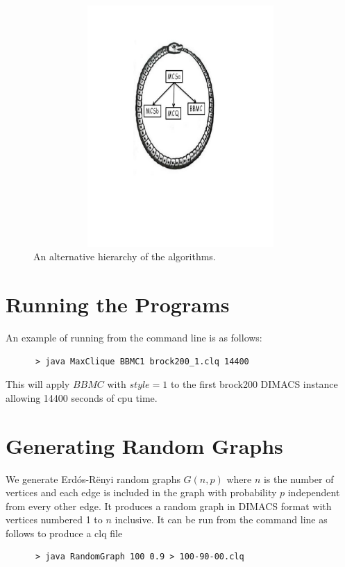 \documentclass{l4proj}
\begin{document}
\begin{figure}
\centering
\includegraphics[height=9.2cm,width=13.2cm]{uroboros.pdf}
\vspace{-30mm}
\caption{An alternative hierarchy of the algorithms.}
\label{uroborus}
\end{figure}



\begin{appendices}

\chapter{Running the Programs}
An example of running from the command line is as follows:
\begin{verbatim}
      > java MaxClique BBMC1 brock200_1.clq 14400
\end{verbatim}
This will apply $BBMC$ with $style = 1$ to the first brock200 DIMACS instance allowing 14400 seconds of cpu time.

\chapter{Generating Random Graphs}
\label{sec:randomGraph}
We generate Erd\'{o}s-R\"{e}nyi random graphs $G(n,p)$ where $n$ is the number of vertices and
each edge is included in the graph with probability $p$ independent from every other edge. It produces
a random graph in DIMACS format with vertices numbered 1 to $n$ inclusive. It can be run from the command line as follows to produce 
a clq file
\begin{verbatim}
      > java RandomGraph 100 0.9 > 100-90-00.clq
\end{verbatim}
\end{appendices}




\end{document}
